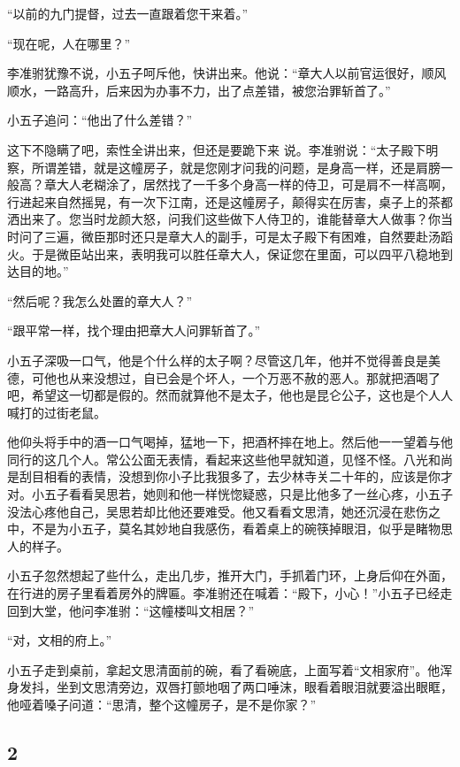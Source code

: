 “以前的九门提督，过去一直跟着您干来着。”

“现在呢，人在哪里？”

李准驸犹豫不说，小五子呵斥他，快讲出来。他说：“章大人以前官运很好，顺风顺水，一路高升，后来因为办事不力，出了点差错，被您治罪斩首了。”

小五子追问：“他出了什么差错？”

这下不隐瞒了吧，索性全讲出来，但还是要跪下来
说。李准驸说：“太子殿下明察，所谓差错，就是这幢房子，就是您刚才问我的问题，是身高一样，还是肩膀一般高？章大人老糊涂了，居然找了一千多个身高一样的侍卫，可是肩不一样高啊，行进起来自然摇晃，有一次下江南，还是这幢房子，颠得实在厉害，桌子上的茶都洒出来了。您当时龙颜大怒，问我们这些做下人侍卫的，谁能替章大人做事？你当时问了三遍，微臣那时还只是章大人的副手，可是太子殿下有困难，自然要赴汤蹈火。于是微臣站出来，表明我可以胜任章大人，保证您在里面，可以四平八稳地到达目的地。”

“然后呢？我怎么处置的章大人？”

“跟平常一样，找个理由把章大人问罪斩首了。”

小五子深吸一口气，他是个什么样的太子啊？尽管这几年，他并不觉得善良是美德，可他也从来没想过，自已会是个坏人，一个万恶不赦的恶人。那就把酒喝了吧，希望这一切都是假的。然而就算他不是太子，他也是昆仑公子，这也是个人人喊打的过街老鼠。

他仰头将手中的酒一口气喝掉，猛地一下，把酒杯摔在地上。然后他一一望着与他同行的这几个人。常公公面无表情，看起来这些他早就知道，见怪不怪。八光和尚是刮目相看的表情，没想到你小子比我狠多了，去少林寺关二十年的，应该是你才对。小五子看看吴思若，她则和他一样恍惚疑惑，只是比他多了一丝心疼，小五子没法心疼他自己，吴思若却比他还要难受。他又看看文思清，她还沉浸在悲伤之中，不是为小五子，莫名其妙地自我感伤，看着桌上的碗筷掉眼泪，似乎是睹物思人的样子。

小五子忽然想起了些什么，走出几步，推开大门，手抓着门环，上身后仰在外面，在行进的房子里看着房外的牌匾。李准驸还在喊着：“殿下，小心！”小五子已经走回到大堂，他问李准驸：“这幢楼叫文相居？”

“对，文相的府上。”

小五子走到桌前，拿起文思清面前的碗，看了看碗底，上面写着“文相家府”。他浑身发抖，坐到文思清旁边，双唇打颤地咽了两口唾沫，眼看着眼泪就要溢出眼眶，他哑着嗓子问道：“思清，整个这幢房子，是不是你家？”
\newline

{\centering\subsection{2}}

